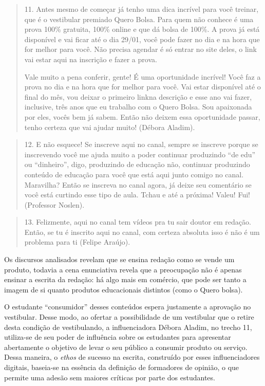\documentclass[portuguese]{textolivre}
\begin{document}
\begin{quote}
  11. Antes mesmo de começar já tenho uma dica incrível para você treinar, que é o vestibular premiado Quero Bolsa. Para quem não conhece é uma prova 100\% gratuita, 100\% online e que dá bolsa de 100\%. A prova já está disponível e vai ficar até o dia 29/01, você pode fazer no dia e na hora que for melhor para você. Não precisa agendar é só entrar no site deles, o link vai estar aqui na inscrição e fazer a prova. 
  
Vale muito a pena conferir, gente! É uma oportunidade incrível! Você faz a prova no dia e na hora que for melhor para você. Vai estar disponível até o final do mês, vou deixar o primeiro linkna descrição e esse ano vai fazer, inclusive, três anos que eu trabalho com o Quero Bolsa. Sou apaixonada por eles, vocês bem já sabem. Então não deixem essa oportunidade passar, tenho certeza que vai ajudar muito! (Débora Aladim).
\end{quote}

\begin{quote}
  12. E não esquece! Se inscreve aqui no canal, sempre se inscreve porque se inscrevendo você me ajuda muito a poder continuar produzindo “de edu” ou “dinheiro”, digo, produzindo de educação não, continuar produzindo conteúdo de educação para você que está aqui junto comigo no canal. Maravilha? Então se inscreva no canal agora, já deixe seu comentário se você está curtindo esse tipo de aula.  Tchau e até a próxima! Valeu! Fui! (Professor Noslen).
\end{quote}

\begin{quote}
 13. Felizmente, aqui no canal tem vídeos pra tu sair doutor em redação. Então, se tu é inscrito aqui no canal, com certeza absoluta isso é não é um problema para ti (Felipe Araújo).
\end{quote}

Os discursos analisados revelam que se ensina redação como se vende um produto, todavia a cena enunciativa revela que a preocupação não é apenas ensinar a escrita da redação: há algo mais em comércio, que pode ser tanto a imagem de si quanto produtos educacionais distintos (como o Quero bolsa). 

O estudante “consumidor” desses conteúdos espera justamente a aprovação no vestibular. Desse modo, ao ofertar a possibilidade de um vestibular que o retire desta condição de vestibulando, a influenciadora Débora Aladim, no trecho 11, utiliza-se de seu poder de influência sobre os estudantes para apresentar abertamente o objetivo de levar o seu público a consumir produto ou serviço. Dessa maneira, o \textit{ethos} de sucesso na escrita, construído por esses influenciadores digitais, baseia-se na essência da definição de formadores de opinião, o que permite uma adesão sem maiores críticas por parte dos estudantes. 
\end{document}
